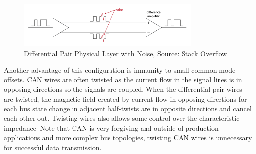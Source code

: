 \documentclass[main.tex]{subfiles}
\begin{document}
\begin{figure}[H]
    \centering
    \includegraphics[width=0.8\textwidth]{images/diff_pair_noise_immunity.png}
    \caption{Differential Pair Physical Layer with Noise, Source: Stack Overflow \cite{stackoverflow_diff_pair_noise}}
    \label{fig:diff-physical-layer-noise}
\end{figure}

\noindent Another advantage of this configuration is immunity to small common mode offsets.
\newline
\noindent CAN wires are often twisted as the current flow in the signal lines is in opposing directions so the signals are coupled. When the differential pair wires are twisted, the magnetic field created by current flow in opposing directions for each bus state change in adjacent half-twists are in opposite directions and cancel each other out. Twisting wires also allows some control over the characteristic impedance. Note that CAN is very forgiving and outside of production applications and more complex bus topologies, twisting CAN wires is unnecessary for successful data transmission. 
\end{document}
